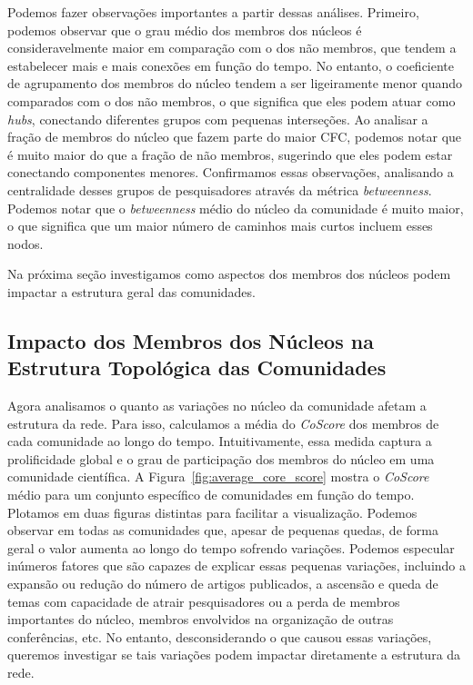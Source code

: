 \documentclass[12pt]{article}
\begin{document}
Podemos fazer observações importantes a partir dessas análises. Primeiro, podemos observar que o grau médio dos membros 
dos núcleos é consideravelmente maior em comparação com o dos não membros, que tendem a estabelecer mais e mais 
conexões em função do tempo. No entanto, o coeficiente de agrupamento dos membros do núcleo tendem a ser 
ligeiramente menor quando comparados com o dos não membros, o que significa que eles podem atuar como \textit{hubs}, conectando 
diferentes grupos com pequenas interseções. Ao analisar a fração de membros do núcleo que fazem parte do maior 
CFC, podemos notar que é muito maior do que a fração de não membros, sugerindo que eles podem estar conectando componentes 
menores. Confirmamos essas observações, analisando a centralidade desses grupos de pesquisadores através da métrica \textit{betweenness}. 
Podemos notar que o \textit{betweenness} médio do núcleo da comunidade é muito maior, o que significa que um maior número de caminhos mais 
curtos incluem esses nodos.

Na próxima seção investigamos como aspectos dos membros dos núcleos podem impactar a estrutura geral das comunidades.

\subsection{Impacto dos Membros dos Núcleos na Estrutura Topológica das Comunidades}

Agora analisamos o quanto as variações no núcleo da comunidade afetam a estrutura da rede. Para isso, calculamos 
a média do \textit{CoScore} dos membros de cada comunidade ao longo do tempo. Intuitivamente, essa medida captura a 
prolificidade global e o grau de participação dos membros do núcleo em uma comunidade científica. A Figura~\ref{fig:average_core_score} 
mostra o \textit{CoScore} médio para um conjunto específico de comunidades em função do tempo.
Plotamos em duas figuras distintas para facilitar a visualização. Podemos observar em todas as comunidades que, 
apesar de pequenas quedas, de forma geral o valor aumenta 
ao longo do tempo sofrendo variações. Podemos especular inúmeros fatores que são capazes de explicar essas pequenas variações, incluindo a expansão 
ou redução do número de artigos publicados, a ascensão e queda de temas com capacidade de atrair pesquisadores ou a perda de 
membros importantes do núcleo, membros envolvidos na organização de outras conferências, etc. No entanto, desconsiderando o que 
causou essas variações, queremos investigar se tais variações podem impactar diretamente a estrutura da rede.
\end{document}
